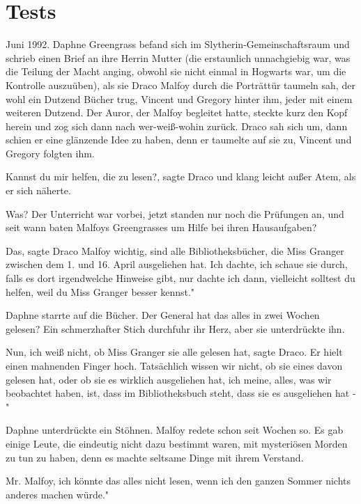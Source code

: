 \chapter{Tests}

Juni 1992. Daphne Greengrass befand sich im Slytherin-Gemeinschaftsraum und
schrieb einen Brief an ihre Herrin Mutter (die erstaunlich unnachgiebig war, was
die Teilung der Macht anging, obwohl sie nicht einmal in Hogwarts war, um die
Kontrolle auszuüben), als sie Draco Malfoy durch die Porträttür taumeln sah, der
wohl ein Dutzend Bücher trug, Vincent und Gregory hinter ihm, jeder mit einem
weiteren Dutzend. Der Auror, der Malfoy begleitet hatte, steckte kurz den Kopf
herein und zog sich dann nach wer-weiß-wohin zurück. Draco sah sich um, dann
schien er eine glänzende Idee zu haben, denn er taumelte auf sie zu, Vincent und
Gregory folgten ihm.

\glqq Kannst du mir helfen, die zu lesen?\grqq{}, sagte Draco und klang leicht
außer Atem, als er sich näherte.

\glqq Was?\grqq{} Der Unterricht war vorbei, jetzt standen nur noch die
Prüfungen an, und seit wann baten Malfoys Greengrasses um Hilfe bei ihren
Hausaufgaben?

\glqq Das\grqq{}, sagte Draco Malfoy wichtig, \glqq sind alle Bibliotheksbücher,
die Miss Granger zwischen dem 1. und 16. April ausgeliehen hat. Ich dachte, ich
schaue sie durch, falls es dort irgendwelche Hinweise gibt, nur dachte ich dann,
vielleicht solltest du helfen, weil du Miss Granger besser kennst."

Daphne starrte auf die Bücher. \glqq Der General hat das alles in zwei Wochen
gelesen?\grqq{} Ein schmerzhafter Stich durchfuhr ihr Herz, aber sie
unterdrückte ihn.

\glqq Nun, ich weiß nicht, ob Miss Granger sie alle gelesen hat\grqq{}, sagte
Draco. Er hielt einen mahnenden Finger hoch. \glqq Tatsächlich wissen wir nicht,
ob sie eines davon gelesen hat, oder ob sie es wirklich ausgeliehen hat, ich
meine, alles, was wir beobachtet haben, ist, dass im Bibliotheksbuch steht, dass
sie es ausgeliehen hat -"

Daphne unterdrückte ein Stöhnen. Malfoy redete schon seit Wochen so. Es gab
einige Leute, die eindeutig nicht dazu bestimmt waren, mit mysteriösen Morden zu
tun zu haben, denn es machte seltsame Dinge mit ihrem Verstand.

\glqq Mr. Malfoy, ich könnte das alles nicht lesen, wenn ich den ganzen Sommer
nichts anderes machen würde."

